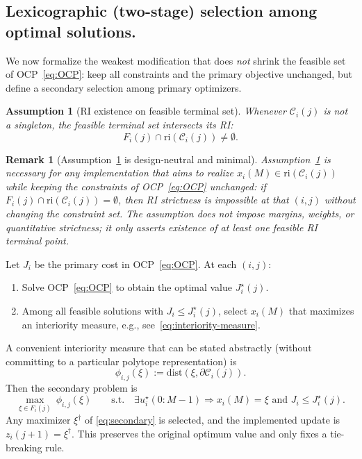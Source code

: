 \documentclass[12pt,draftcls,onecolumn]{IEEEtran}
\newtheorem{assumption}{Assumption}
\newtheorem{remark}{Remark}
\def\Cij{\mathcal{C}_i (j)}
\def\dist{\mathrm{dist}}
\def\ri{\mathrm{ri}}
\begin{document}
\subsection{Lexicographic (two-stage) selection among optimal solutions.}\label{subsec:lexicographic-selc}

We now formalize the weakest modification that does \emph{not} shrink the feasible set of OCP~\eqref{eq:OCP}:
keep all constraints and the primary objective unchanged, but define a secondary selection among primary optimizers.

\begin{assumption}[RI existence on feasible terminal set]\label{ass:RIexist_ocp}
Whenever $\Cij$ is not a singleton, the feasible terminal set intersects its RI:
\begin{equation}\label{eq:RIexist_ocp}
F_i(j)\cap \ri(\Cij)\neq\emptyset.
\end{equation}
\end{assumption}

\begin{remark}[Assumption~\ref{ass:RIexist_ocp} is design-neutral and minimal]\label{rem:design_neutral}
Assumption~\ref{ass:RIexist_ocp} is \emph{necessary} for any implementation that aims to realize
$x_i(M)\in\ri(\Cij)$ while keeping the constraints of OCP~\eqref{eq:OCP} unchanged:
if $F_i(j)\cap \ri(\Cij)=\emptyset$, then RI strictness is impossible at that $(i,j)$ without
changing the constraint set. The assumption does not impose margins, weights, or quantitative strictness; it
only asserts existence of at least one feasible RI terminal point.
\end{remark}

Let $J_i$ be the primary cost in OCP~\eqref{eq:OCP}.
At each $(i,j)$:
\begin{enumerate}
\item Solve OCP~\eqref{eq:OCP} to obtain the optimal value $J_i^\star(j)$.
\item Among all feasible solutions with $J_i\le J_i^\star(j)$, select $x_i(M)$ that maximizes an
interiority measure, e.g., see~\eqref{eq:interiority-measure}.
\end{enumerate}
A convenient interiority measure that can be stated abstractly (without committing to a particular
polytope representation) is
\begin{equation}\label{eq:interiority-measure}
    \phi_{i,j}(\xi) := \dist(\xi,\partial \Cij).
\end{equation}
Then the secondary problem is
\begin{equation}\label{eq:secondary}
\max_{\xi\in F_i(j)}\ \phi_{i,j}(\xi)\qquad \text{s.t.}\quad \exists u_i^\star(0{:}M-1) \Rightarrow 
x_i(M)=\xi \text{ and } J_i\le J_i^\star(j).
\end{equation}
Any maximizer $\xi^\dagger$ of \eqref{eq:secondary} is selected, and the implemented update is
$z_i(j{+}1)=\xi^\dagger$.
This preserves the original optimum value and only fixes a tie-breaking rule.
\end{document}
